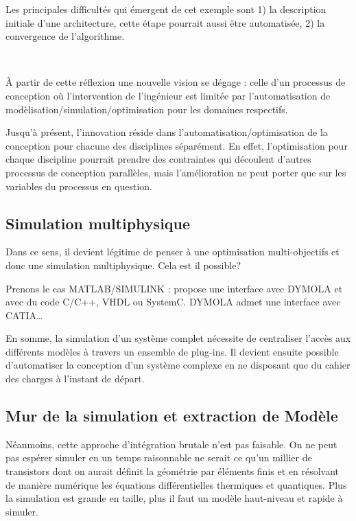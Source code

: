 \documentclass[11pt]{article}
\begin{document}
Les principales difficultés qui émergent de cet exemple sont 1) la description
initiale d'une architecture, cette étape pourrait aussi être automatisée, 2) la
convergence de l'algorithme.

~

\`A partir de cette réflexion une nouvelle vision se dégage : celle d'un
processus de conception où l'intervention de l'ingénieur est limitée par
l'automatisation de modèlisation/simulation/optimisation pour les domaines
respectifs.

Jusqu'à présent, l'innovation réside dans l'automatisation/optimisation de la
conception pour chacune des disciplines séparément. En effet, l'optimisation
pour chaque discipline pourrait prendre des contraintes qui découlent d'autres
processus de conception parallèles, mais l'amélioration ne peut porter que sur
les variables du processus en question.

\subsection{Simulation multiphysique}

Dans ce sens, il devient légitime de penser à une optimisation multi-objectifs 
et donc une simulation multiphysique. Cela est il possible?

Prenons le cas MATLAB/SIMULINK : propose une interface avec DYMOLA et avec du
code C/C++, VHDL ou SystemC. DYMOLA admet une interface avec CATIA\ldots

En somme, la simulation d'un système complet nécessite de centraliser l'accès
aux différents modèles à travers un ensemble de plug-ins. Il devient ensuite
possible d'automatiser la conception d'un système complexe en ne disposant que
du cahier des charges à l'instant de départ.

\subsection{Mur de la simulation et extraction de Modèle}

Néanmoins, cette approche d'intégration brutale n'est pas faisable. On ne peut
pas espérer simuler en un temps raisonnable ne serait ce qu'un millier de
transistors dont on aurait définit la géométrie par éléments finis et en
résolvant de manière numérique les équations différentielles thermiques et
quantiques. Plus la simulation est grande en taille, plus il faut un modèle
haut-niveau et rapide à simuler.
\end{document}
